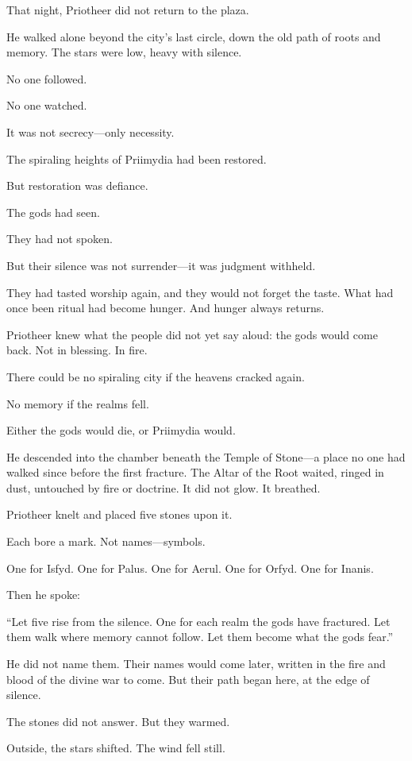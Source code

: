 \documentclass[12pt]{article}
\begin{document}
That night, Priotheer did not return to the plaza.

He walked alone beyond the city’s last circle, down the old path of roots and memory. The stars were low, heavy with silence. 

No one followed.

No one watched. 

It was not secrecy—only necessity.

The spiraling heights of Priimydia had been restored. 

But restoration was defiance.

The gods had seen.

They had not spoken. 

But their silence was not surrender—it was judgment withheld. 

They had tasted worship again, and they would not forget the taste. What had once been ritual had become hunger. And hunger always returns.

Priotheer knew what the people did not yet say aloud: the gods would come back. Not in blessing. In fire.

There could be no spiraling city if the heavens cracked again. 

No memory if the realms fell. 

Either the gods would die, or Priimydia would.

He descended into the chamber beneath the Temple of Stone—a place no one had walked since before the first fracture. The Altar of the Root waited, ringed in dust, untouched by fire or doctrine. It did not glow. It breathed.

Priotheer knelt and placed five stones upon it.

Each bore a mark. Not names—symbols.

One for Isfyd. One for Palus. One for Aerul. One for Orfyd. One for Inanis.

Then he spoke:

“Let five rise from the silence. One for each realm the gods have fractured.  
Let them walk where memory cannot follow.  
Let them become what the gods fear.”

He did not name them. Their names would come later, written in the fire and blood of the divine war to come. But their path began here, at the edge of silence.

The stones did not answer. But they warmed.

Outside, the stars shifted. The wind fell still.
\end{document}
